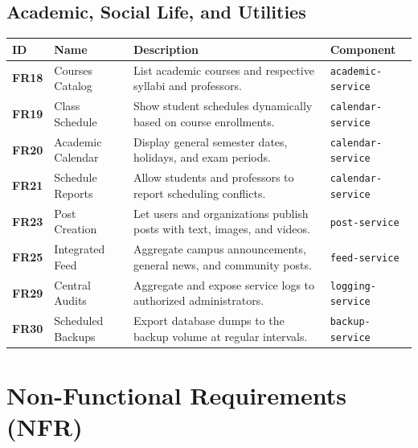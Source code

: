 \subsection{Academic, Social Life, and Utilities}
\begin{tabular}{|l|l|p{7.5cm}|l|}
\hline
\textbf{ID} & \textbf{Name} & \textbf{Description} & \textbf{Component} \\ \hline
\textbf{FR18} & Courses Catalog & List academic courses and respective syllabi and professors. & \texttt{academic-service} \\ \hline
\textbf{FR19} & Class Schedule & Show student schedules dynamically based on course enrollments. & \texttt{calendar-service} \\ \hline
\textbf{FR20} & Academic Calendar & Display general semester dates, holidays, and exam periods. & \texttt{calendar-service} \\ \hline
\textbf{FR21} & Schedule Reports & Allow students and professors to report scheduling conflicts. & \texttt{calendar-service} \\ \hline
\textbf{FR23} & Post Creation & Let users and organizations publish posts with text, images, and videos. & \texttt{post-service} \\ \hline
\textbf{FR25} & Integrated Feed & Aggregate campus announcements, general news, and community posts. & \texttt{feed-service} \\ \hline
\textbf{FR29} & Central Audits & Aggregate and expose service logs to authorized administrators. & \texttt{logging-service} \\ \hline
\textbf{FR30} & Scheduled Backups & Export database dumps to the backup volume at regular intervals. & \texttt{backup-service} \\ \hline
\end{tabular}

\newpage

\section{Non-Functional Requirements (NFR)}

